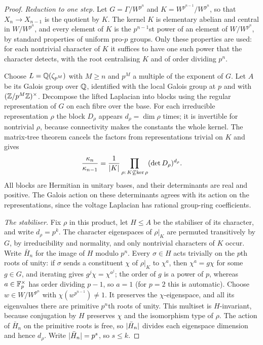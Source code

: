 \begin{proof}
\emph{Reduction to one step.} Let $G=\Gamma/W^{p^n}$ and
$K=W^{p^{n-1}}/W^{p^n}$, so that $X_n\to X_{n-1}$ is the quotient by $K$.
The kernel $K$ is elementary abelian and central in $W/W^{p^n}$, and every
element of $K$ is the $p^{n-1}$st power of an element of $W/W^{p^n}$, by
standard properties of uniform pro-$p$ groups. Only these properties are
used: for each nontrivial character of $K$ it suffices to have one such
power that the character detects, with the root centralising $K$ and of
order dividing $p^n$.

Choose $L=\mathbb{Q}(\zeta_{p^M})$ with $M\ge n$ and $p^M$ a multiple of the
exponent of $G$. Let $A$ be its Galois group over $\mathbb{Q}$, identified with
the local Galois group at $p$ and with $(\mathbb{Z}/p^M\mathbb{Z})^\times$. Decompose the
lifted Laplacian into blocks using the regular representation of $G$ on
each fibre over the base. For each irreducible representation $\rho$ the
block $D_\rho$ appears $d_\rho=\dim\rho$ times; it is invertible for
nontrivial $\rho$, because connectivity makes the constants the whole
kernel. The matrix-tree theorem cancels the factors from representations
trivial on $K$ and gives
\[
 \frac{\kappa_n}{\kappa_{n-1}}=\frac1{\lvert K\rvert}
 \prod_{\rho:\,K\not\subseteq\ker\rho}(\det D_\rho)^{d_\rho}.
\]
All blocks are Hermitian in unitary bases, and their determinants are
real and positive. The Galois action on these determinants agrees with its
action on the representations, since the voltage Laplacian has rational
group-ring coefficients.

\emph{The stabiliser.} Fix $\rho$ in this product, let $H\le A$ be the
stabiliser of its character, and write $d_\rho=p^k$. The character
eigenspaces of $\rho|_K$ are permuted transitively by $G$, by
irreducibility and normality, and only nontrivial characters of $K$
occur. Write $\bar H_n$ for the image of $H$ modulo $p^n$. Every
$\sigma\in H$ acts trivially on the $p$th roots of unity: if $\sigma$
sends a constituent $\chi$ of $\rho|_K$ to $\chi^a$, then $\chi^a=g\chi$
for some $g\in G$, and iterating gives $g^j\chi=\chi^{a^j}$; the order of
$g$ is a power of $p$, whereas $a\in\mathbb{F}_p^\times$ has order dividing $p-1$,
so $a=1$ (for $p=2$ this is automatic). Choose $w\in W/W^{p^n}$ with
$\chi(w^{p^{n-1}})\ne1$. It preserves the $\chi$-eigenspace, and all its
eigenvalues there are primitive $p^n$th roots of unity. This multiset is
$H$-invariant, because conjugation by $H$ preserves $\chi$ and the
isomorphism type of $\rho$. The action of $\bar H_n$ on the primitive
roots is free, so $\lvert\bar H_n\rvert$ divides each eigenspace dimension and
hence $d_\rho$. Write $\lvert\bar H_n\rvert=p^s$, so $s\le k$.


\end{proof}
